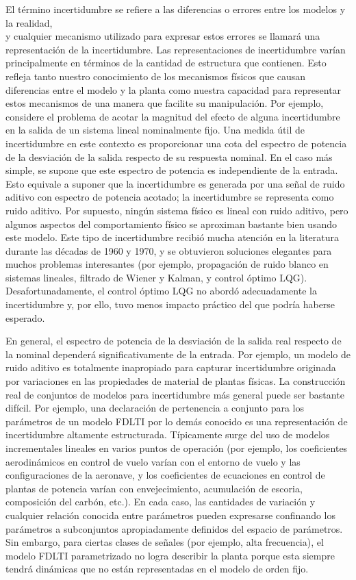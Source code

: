 El término incertidumbre se refiere a las diferencias o errores entre los modelos y la realidad,\\
y cualquier mecanismo utilizado para expresar estos errores se llamará una representación de la incertidumbre. Las representaciones de incertidumbre varían principalmente en términos de la cantidad de estructura que contienen. Esto refleja tanto nuestro conocimiento de los mecanismos físicos que causan diferencias entre el modelo y la planta como nuestra capacidad para representar estos mecanismos de una manera que facilite su manipulación. Por ejemplo, considere el problema de acotar la magnitud del efecto de alguna incertidumbre en la salida de un sistema lineal nominalmente fijo. Una medida útil de incertidumbre en este contexto es proporcionar una cota del espectro de potencia de la desviación de la salida respecto de su respuesta nominal. En el caso más simple, se supone que este espectro de potencia es independiente de la entrada. Esto equivale a suponer que la incertidumbre es generada por una señal de ruido aditivo con espectro de potencia acotado; la incertidumbre se representa como ruido aditivo. Por supuesto, ningún sistema físico es lineal con ruido aditivo, pero algunos aspectos del comportamiento físico se aproximan bastante bien usando este modelo. Este tipo de incertidumbre recibió mucha atención en la literatura durante las décadas de 1960 y 1970, y se obtuvieron soluciones elegantes para muchos problemas interesantes (por ejemplo, propagación de ruido blanco en sistemas lineales, filtrado de Wiener y Kalman, y control óptimo LQG). Desafortunadamente, el control óptimo LQG no abordó adecuadamente la incertidumbre y, por ello, tuvo menos impacto práctico del que podría haberse esperado.

En general, el espectro de potencia de la desviación de la salida real respecto de la nominal dependerá significativamente de la entrada. Por ejemplo, un modelo de ruido aditivo es totalmente inapropiado para capturar incertidumbre originada por variaciones en las propiedades de material de plantas físicas. La construcción real de conjuntos de modelos para incertidumbre más general puede ser bastante difícil. Por ejemplo, una declaración de pertenencia a conjunto para los parámetros de un modelo FDLTI por lo demás conocido es una representación de incertidumbre altamente estructurada. Típicamente surge del uso de modelos incrementales lineales en varios puntos de operación (por ejemplo, los coeficientes aerodinámicos en control de vuelo varían con el entorno de vuelo y las configuraciones de la aeronave, y los coeficientes de ecuaciones en control de plantas de potencia varían con envejecimiento, acumulación de escoria, composición del carbón, etc.). En cada caso, las cantidades de variación y cualquier relación conocida entre parámetros pueden expresarse confinando los parámetros a subconjuntos apropiadamente definidos del espacio de parámetros. Sin embargo, para ciertas clases de señales (por ejemplo, alta frecuencia), el modelo FDLTI parametrizado no logra describir la planta porque esta siempre tendrá dinámicas que no están representadas en el modelo de orden fijo.

